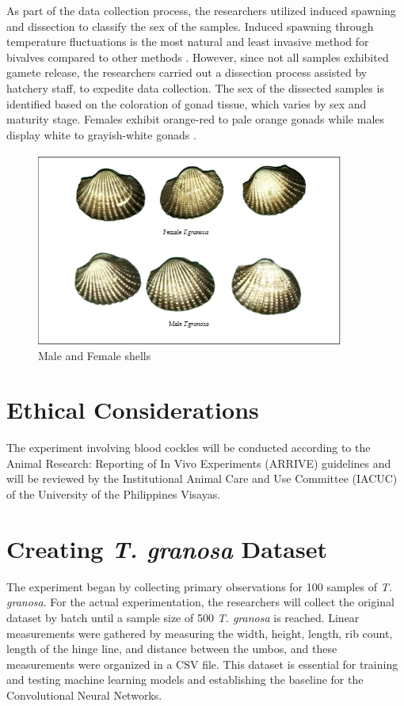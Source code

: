 As part of the data collection process, the researchers utilized induced spawning and dissection to classify the sex of the samples. Induced spawning through temperature fluctuations is the most natural and least invasive method for bivalves compared to other methods \cite{aji}. However, since not all samples exhibited gamete release, the researchers carried out a dissection process assisted by hatchery staff, to expedite data collection. The sex of the dissected samples is identified based on the coloration of gonad tissue, which varies by sex and maturity stage. Females exhibit orange-red to pale orange gonads while males display white to grayish-white gonads \cite{may2021}. 

\begin{figure}[!htbp]
	\centering
	\includegraphics[width=0.9\textwidth]{figures/male-female T.granosa.png}
	\caption{Male and Female \Tegillarcagranosa shells}
\end{figure}

\section{Ethical Considerations}
\label{sec:ethical}

The experiment involving blood cockles will be conducted according to the Animal Research: Reporting of In Vivo Experiments (ARRIVE) guidelines and will be reviewed by the Institutional Animal Care and Use Committee (IACUC) of the University of the Philippines Visayas. 

\section{Creating \textit{T. granosa} Dataset}
\label{sec:dataset}

The experiment began by collecting primary observations for 100 samples of \textit{T. granosa}. For the actual experimentation, the researchers will collect the original dataset by batch until a sample size of 500  \textit{T. granosa} is reached. Linear measurements were gathered by measuring the width, height, length, rib count, length of the hinge line, and distance between the umbos, and these measurements were organized in a CSV file. This dataset is essential for training and testing machine learning models and establishing the baseline for the Convolutional Neural Networks.

